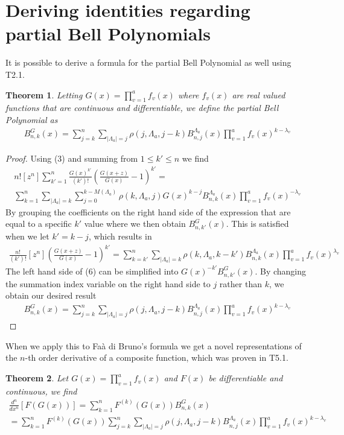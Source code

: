 \documentclass[11pt]{article}
\theoremstyle{plain}
\newtheorem{theorem}{Theorem}[section]   %
\theoremstyle{definition}
\begin{document}
\section{Deriving identities regarding partial Bell Polynomials}
It is possible to derive a formula for the partial Bell Polynomial as well using T2.1.
\begin{theorem}
    Letting $G(x)= \prod_{v=1}^a f_v(x)$ where $f_v(x)$ are real valued functions that are continuous and differentiable, we define the partial Bell Polynomial as
    \begin{align*}
        B_{n,k}^G(x) = \sum_{j=k}^n \sum_{|\Lambda_a|=j} \rho(j,\Lambda_a,j-k) B_{n,j}^{\Lambda_a}(x) \prod_{v=1}^a f_v(x)^{k-\lambda_v} \tag{T5.1}
    \end{align*}
\end{theorem}
\begin{proof}
    Using (3) and summing from $1 \le k' \le n$ we find
    \begin{align*}
        n![z^n] \sum_{k'=1}^n\frac{G(x)^{k'}}{(k')!}\left(\frac{G(x+z)}{G(x)}-1\right)^{k'} = 
    \\
    \sum_{k=1}^n \sum_{|\Lambda_a|=k}\sum_{j=0}^{k-M(\Lambda_a)}\rho(k,\Lambda_a,j) G(x)^{k-j}B_{n,k}^{\Lambda_a}(x) \prod_{v=1}^a f_v(x)^{-\lambda_v}
    \end{align*}
    By grouping the coefficients on the right hand side of the expression that are equal to a specific $k'$ value where we then obtain $B_{n,k'}^G(x)$. This is satisfied when we let $k'=k-j$, which results in
    \begin{align*}
        \frac{n!}{(k')!}[z^n]\left(\frac{G(x+z)}{G(x)}-1\right)^{k'} = \sum_{k=k'}^n \sum_{|\Lambda_a|=k} \rho(k,\Lambda_a,k-k')B_{n,k}^{\Lambda_a}(x) \prod_{v=1}^a f_v(x)^{\lambda_v} \tag{6}
    \end{align*}
    The left hand side of (6) can be simplified into $G(x)^{-k'}B_{n,k'}^G(x)$. By changing the summation index variable on the right hand side to $j$ rather than $k$, we obtain our desired result
    \begin{align*}
        B_{n,k}^G(x) = \sum_{j=k}^n \sum_{|\Lambda_a|=j} \rho(j,\Lambda_a,j-k) B_{n,j}^{\Lambda_a}(x) \prod_{v=1}^a f_v(x)^{k-\lambda_v}
    \end{align*}
\end{proof}
When we apply this to Faà di Bruno’s formula we get a novel representations of the $n$-th order derivative of a composite function, which was proven in T5.1.
\begin{theorem}
 Let $G(x) = \prod_{v=1}^af_v(x)$ and $F(x)$ be differentiable and continuous, we find
\begin{align*}
\frac{d^n}{dx^n}[F(G(x))] = \sum_{k=1}^n F^{(k)}(G(x)) B_{n,k}^G(x) \\
= \sum_{k=1}^n F^{(k)}(G(x)) \sum_{j=k}^n \sum_{|\Lambda_a|=j} \rho(j,\Lambda_a,j-k) B_{n,j}^{\Lambda_a}(x) \prod_{v=1}^a f_v(x)^{k-\lambda_v}
\end{align*}
\end{theorem}
\end{document}

